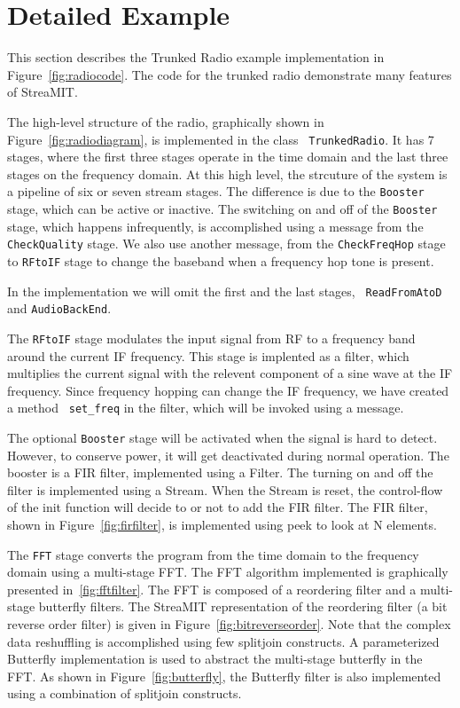 \section{Detailed Example}
This section describes the Trunked Radio example implementation in
Figure~\ref{fig:radiocode}. The code for the trunked radio demonstrate
many features of StreaMIT.

The high-level structure of the radio, graphically shown in
Figure~\ref{fig:radiodiagram}, is implemented in the class {\tt
TrunkedRadio}. It has 7 stages, where the first three stages operate
in the time domain and the last three stages on the frequency domain.
At this high level, the strcuture of the system is a pipeline of six
or seven stream stages. The difference is due to the {\tt Booster}
stage, which can be active or inactive. The switching on and off of
the {\tt Booster} stage, which happens infrequently, is accomplished
using a message from the {\tt CheckQuality} stage. We also use another
message, from the {\tt CheckFreqHop} stage to {\tt RFtoIF} stage to
change the baseband when a frequency hop tone is present.

In the implementation we will omit the first and the last stages, {\tt
ReadFromAtoD} and {\tt AudioBackEnd}. 

The {\tt RFtoIF} stage modulates the input signal from RF to a
frequency band around the current IF frequency. This stage is
implented as a filter, which multiplies the current signal with the
relevent component of a sine wave at the IF frequency. Since frequency
hopping can change the IF frequency, we have created a method {\tt
set\_freq} in the filter, which will be invoked using a message.

The optional {\tt Booster} stage will be activated when the signal is
hard to detect. However, to conserve power, it will get deactivated
during normal operation. The booster is a FIR filter, implemented
using a Filter. The turning on and off the filter is implemented using
a Stream. When the Stream is reset, the control-flow of the init
function will decide to or not to add the FIR filter.  The FIR filter,
shown in Figure~\ref{fig:firfilter}, is implemented using peek
to look at N elements.

The {\tt FFT} stage converts the program from the time domain to the
frequency domain using a multi-stage FFT. The FFT algorithm
implemented is graphically presented in~\ref{fig:fftfilter}. The FFT
is composed of a reordering filter and a multi-stage butterfly
filters. The StreaMIT representation of the reordering filter (a bit
reverse order filter) is given in
Figure~\ref{fig:bitreverseorder}. Note that the complex data
reshuffling is accomplished using few splitjoin constructs.  A
parameterized Butterfly implementation is used to abstract the
multi-stage butterfly in the FFT. As shown in
Figure~\ref{fig:butterfly}, the Butterfly filter is also implemented
using a combination of splitjoin constructs. 

